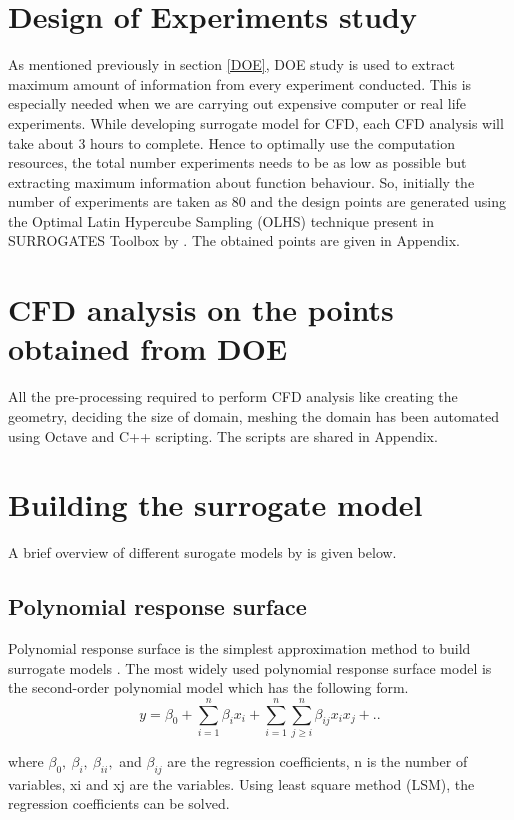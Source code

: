 \section{Design of Experiments study}

As mentioned previously in section \ref{DOE}, DOE study is used to extract maximum amount of information from every experiment conducted. This is especially needed when we are carrying out expensive computer or real life experiments. While developing surrogate model for CFD, each CFD analysis will take about 3 hours to complete. Hence to optimally use the computation resources, the total number experiments needs to be as low as possible but extracting maximum information about function behaviour. So, initially the number of experiments are taken as 80 and the design points are generated using the Optimal Latin Hypercube Sampling (OLHS) technique present in SURROGATES Toolbox by \cite{viana2014metamodeling}. The obtained points are given in Appendix.

\section{CFD analysis on the points obtained from DOE}

All the pre-processing required to perform CFD analysis like creating the geometry, deciding the size of domain, meshing the domain has been automated using Octave and C++ scripting. The scripts are shared in Appendix.
\section{Building the surrogate model}
A brief overview of different surogate models by \cite{luo2014comparison} is given below.
\subsection{Polynomial response surface}
Polynomial response surface is the simplest approximation method to build surrogate models \cite{forrester2009recent}. The most widely used polynomial response surface model is the second-order polynomial model which has the following form.
\begin{equation}
y = \beta _{0} + \sum_{i=1}^{n} \beta _{i} x_{i} + \sum_{i=1}^{n} \sum_{j \ge i}^{n} \beta _{ij} x_{i} x_{j} + ..
\end{equation}

where $ \beta _{0},\ \beta_{i},\ \beta _{ii},$ and $ \beta _{ij} $ are the regression coefficients, n is the number of variables, xi and xj are the variables. Using least square method (LSM), the regression coefficients can be solved.

